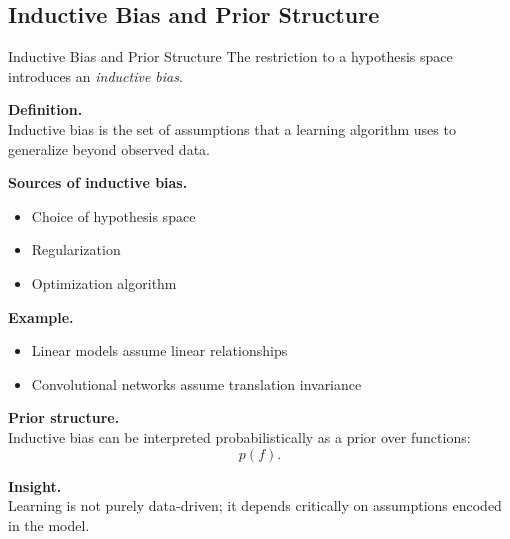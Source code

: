 \documentclass[aspectratio=169,11pt]{beamer}
\begin{document}
\subsection{Inductive Bias and Prior Structure}
\begin{frame}[t,allowframebreaks]{Inductive Bias and Prior Structure}
\small
The restriction to a hypothesis space introduces an \emph{inductive bias}.

\textbf{Definition.}\\ Inductive bias is the set of assumptions that a learning algorithm uses to generalize beyond observed data.

\textbf{Sources of inductive bias.}\\ \begin{itemize}
    \item Choice of hypothesis space
    \item Regularization
    \item Optimization algorithm
\end{itemize}

\textbf{Example.}\\ \begin{itemize}
    \item Linear models assume linear relationships
    \item Convolutional networks assume translation invariance
\end{itemize}

\textbf{Prior structure.}\\ Inductive bias can be interpreted probabilistically as a prior over functions:
\[
p(f).
\]

\textbf{Insight.}\\ Learning is not purely data-driven; it depends critically on assumptions encoded in the model.
\end{frame}
\end{document}
